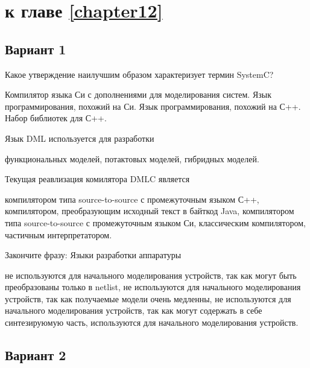 \section{\Questions к главе \ref{chapter12}} %

\subsection*{Вариант 1}

\begin{questions}

\question[3] Какое утверждение наилучшим образом характеризует термин SystemC?
\begin{choices}
    \choice Компилятор языка Си с дополнениями для моделирования систем.
    \choice Язык программирования, похожий на Си.
    \choice Язык программирования, похожий на С++.
    \correctchoice Набор библиотек для С++.
\end{choices}

\question[3] Язык DML используется для разработки
\begin{choices}
    \correctchoice функциональных моделей,
    \choice потактовых моделей,
    \choice гибридных моделей.
\end{choices}

\question[3] Текущая реавлизация комилятора DMLC является
\begin{choices}
    \choice компилятором типа source-to-source с промежуточным языком С++,
    \choice компилятором, преобразующим исходный текст в байткод Java,
    \correctchoice компилятором типа source-to-source с промежуточным языком Си,
    \choice классическим компилятором,
    \choice частичным интерпретатором.
\end{choices}

\question[3] Закончите фразу: Языки разработки аппаратуры
\begin{choices}
\choice не используются для начального моделирования устройств, так как могут быть преобразованы только в netlist,
\correctchoice не используются для начального моделирования устройств, так как получаемые модели очень медленны,
\choice не используются для начального моделирования устройств, так как могут содержать в себе синтезируюмую часть,
\choice используются для начального моделирования устройств.
\end{choices}

\end{questions}

\subsection*{Вариант 2}

